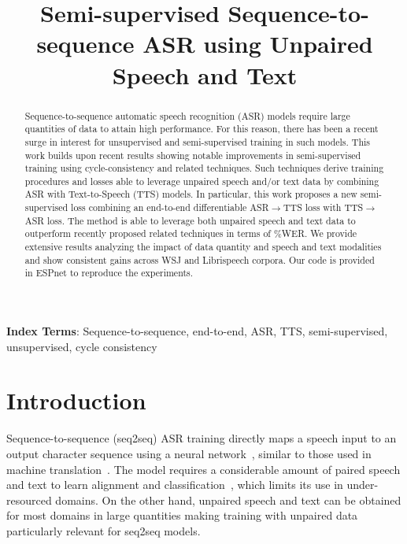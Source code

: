 \documentclass[a4paper]{article}
\title{Semi-supervised Sequence-to-sequence ASR using Unpaired Speech and Text}
\begin{document}
\maketitle
\begin{abstract}
Sequence-to-sequence automatic speech recognition (ASR) models require large quantities of data to attain high performance. For this reason, there has been a recent surge in interest for unsupervised and semi-supervised training in such models. This work builds upon recent results showing notable improvements in semi-supervised training using cycle-consistency and related techniques. Such techniques derive training procedures and losses able to leverage unpaired speech and/or text data by combining ASR with Text-to-Speech (TTS) models. In particular, this work proposes a new semi-supervised loss combining an end-to-end differentiable ASR$\rightarrow$TTS loss with TTS$\rightarrow$ASR loss. The method is able to leverage both unpaired speech and text data to outperform recently proposed related techniques in terms of \%WER. We provide extensive results analyzing the impact of data quantity and speech and text modalities and show consistent gains across WSJ and Librispeech corpora. Our code is provided in ESPnet to reproduce the experiments.
\end{abstract}
\medskip
	
\noindent\textbf{Index Terms}:  Sequence-to-sequence, end-to-end, ASR, TTS, semi-supervised, unsupervised, cycle consistency

\section{Introduction}
Sequence-to-sequence (seq2seq) ASR training directly maps a speech input to an output character sequence using a neural network~\cite{graves2014towards,bahdanau2016end,chan2016LAS}, similar to those used in machine translation~\cite{bahdanau2014neural,sutskever2014sequence}. The model requires a considerable amount of paired speech and text to learn alignment and classification~\cite{amodei2016deep,prabhavalkar2017comparison}, which limits its use in under-resourced domains. On the other hand, unpaired speech and text can be obtained for most domains in large quantities making training with unpaired data particularly relevant for seq2seq models.
\end{document}
